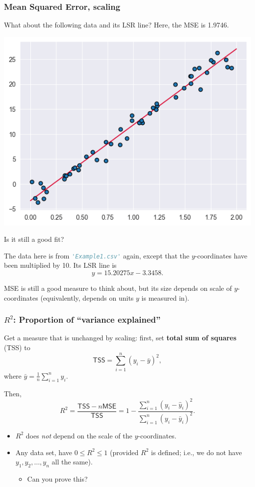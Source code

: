\documentclass{beamer}
\theoremstyle{example}
\begin{document}
\begin{frame}
    \frametitle{Mean Squared Error, scaling}
    What about the following data and its LSR line? Here, the MSE is 1.9746.
    
    \begin{center}
    \includegraphics[height=0.35\textheight]{./Images/example1-lsr-scaled.png}    
    \end{center}
    
    Is it still a good fit? 

    \pause
    The data here is from \lstinline[language=Python, stringstyle=\ttfamily\color{strings}]{'Example1.csv'} again, except that the $y$-coordinates have been multiplied by 10. Its LSR line is 
        \[y = 15.20275x - 3.3458.\]
    
    \pause 
    MSE is still a good measure to think about, but its size depends on scale of $y$-coordinates (equivalently, depends on units $y$ is measured in).

\end{frame}

\begin{frame}
    \frametitle{$R^2$: Proportion of ``variance explained''}
    Get a measure that is unchanged by scaling: first, set \textbf{total sum of squares} (TSS) to 
    \[\textsf{TSS} = \sum_{i=1}^n(y_i - \bar{y})^2,\]
    where $\bar{y} = \frac{1}{n}\sum_{i=1}^n y_i$.

    \pause 
    Then, 
        \[R^2 = \frac{\textsf{TSS} - n\textsf{MSE}}{\textsf{TSS}} = 1 - \frac{\sum_{i=1}^n(y_i - \hat{y}_i)^2}{\sum_{i=1}^n(y_i - \bar{y}_i)^2}.\]
    \pause
    \begin{itemize}
        \item $R^2$ does \emph{not} depend on the scale of the $y$-coordinates.
        \pause
        \item Any data set, have $0\le R^2\le 1$ (provided $R^2$ is defined; i.e., we do not have $y_1,y_2,\ldots,y_n$ all the same).
        \begin{itemize}
            \item Can you prove this?
        \end{itemize}
    \end{itemize}
\end{frame}
\end{document}

